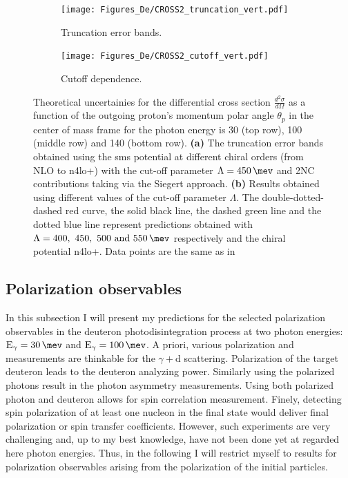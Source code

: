         
    \begin{figure}[h]
        \centering
        \begin{subfigure}[t]{0.46\textwidth}
            \caption{Truncation error bands.}
            \texttt{[image: Figures\_De/CROSS2\_truncation\_vert.pdf]}
            \label{Diff_cross_truncation}
        \end{subfigure}
        \begin{subfigure}[t]{0.46\textwidth}
            \caption{Cutoff dependence.}
            \texttt{[image: Figures\_De/CROSS2\_cutoff\_vert.pdf]}
            \label{Diff_cross_cutoff}
        \end{subfigure}
        \caption{Theoretical uncertainies 
        for the differential cross section $\frac{d^2\sigma}{d\Omega}$
        as a function of the outgoing proton's momentum polar angle $\theta_p$ in the center of mass frame 
        for the photon energy is \SI{30}{\mev} (top row), \SI{100}{\mev} (middle row) and \SI{140}{\mev} (bottom row).
        {\bf(a)} The truncation error bands obtained using the \gls{sms} potential
        at different chiral orders (from NLO to \gls{n4lo+}) 
        with the cut-off parameter $\Lambda=\SI{450}{\mev}$ and 2NC contributions taking via the Siegert approach.
        {\bf (b)} Results obtained using different values of the cut-off parameter $\Lambda$.
        The double-dotted-dashed red curve, the solid black line, the dashed green line
        and the dotted blue line represent predictions obtained 
        with $\Lambda=\SIlist[list-units = single]{400;450;500;550}{\mev}$ respectively
        and the chiral potential \gls{n4lo+}. 
        Data points are the same as in }
        \label{Diff_cross_err}
    \end{figure}

    \clearpage

    \subsection{Polarization observables}
    \label{sec:polarization_results}

    In this subsection I will present my predictions for the 
    selected polarization observables in the deuteron photodisintegration process
    at two photon energies: $\text{E}_\gamma = \SI{30}{\mev}$ and
    $\text{E}_\gamma = \SI{100}{\mev}$.
    A priori, various polarization  and measurements
    are thinkable for the $\gamma + \text{d}$ scattering.
    Polarization of the target deuteron leads to the deuteron
    analyzing power.
    Similarly using the polarized photons result in the photon asymmetry measurements.
    Using both polarized photon and deuteron allows for spin
    correlation measurement.
    Finely, detecting spin polarization of at least one nucleon in the final state would deliver
    final polarization or spin transfer coefficients. 
    However, such experiments are very challenging and, up to my best knowledge,
    have not been done yet at regarded here photon energies.
    Thus, in the following I will restrict myself to results for polarization
    observables arising from the polarization of the initial particles.

